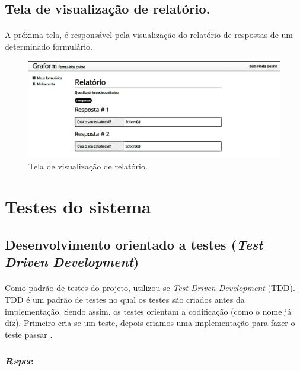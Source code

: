 \documentclass[11pt]{article}
\begin{document}
    \subsection{Tela de visualização de relatório.}
    
    \paragraph{}
    A próxima tela, é responsável pela visualização do relatório de respostas
    de um determinado formulário.
        
    \begin{figure}[h!]
      \centering
      \includegraphics[width=.9\textwidth]{view_report.png}
      \caption{Tela de visualização de relatório.}
    \end{figure}
        
  \clearpage
      
  \section{Testes do sistema}
  
    \subsection{Desenvolvimento orientado a testes ({\em Test Driven Development})}
    
    \paragraph{}

    Como padrão de testes do projeto, utilizou-se {\em Test Driven 
    Development} (TDD). TDD é um padrão de testes no qual os testes são
    criados antes da implementação. Sendo assim, os testes orientam a
    codificação (como o nome já diz). Primeiro cria-se um teste, depois 
    criamos uma implementação para fazer o teste passar \cite{urubatan}.
     
    \subsubsection{{\em Rspec}}
  
\end{document}
